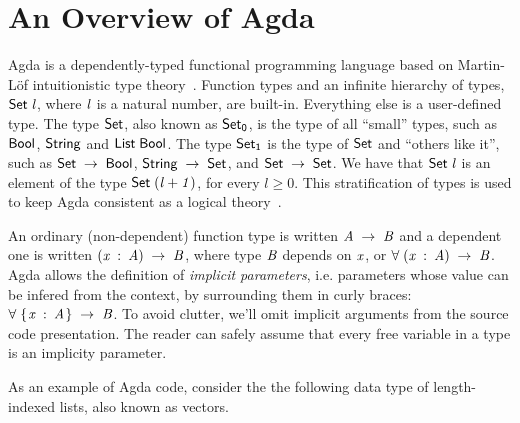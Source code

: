 \documentclass[fleqn,10pt]{SelfArx} %
\renewcommand{\geq}{\geqslant}
\theoremstyle{definition}
\newcommand{\D}[1]{\blue{\mathsf{#1}}}
\newcommand{\V}[1]{\purple{\mathit{#1}}}
\begin{document}
\section{An Overview of Agda}\label{sec:agda}


Agda is a dependently-typed functional programming language based on
Martin-L\"of intuitionistic type theory~\cite{Lof98}.  Function types
and an infinite hierarchy of types, \ensuremath{\D{Set}\;\V{l}}, where \ensuremath{\V{l}} is a
natural number, are built-in. Everything else is a user-defined
type. The type \ensuremath{\D{Set}}, also known as \ensuremath{\D{Set}_{\D{0}}}, is the type of all
``small'' types, such as \ensuremath{\D{Bool}}, \ensuremath{\D{String}} and \ensuremath{\D{List}\;\D{Bool}}.  The type
\ensuremath{\D{Set}_{\D{1}}} is the type of \ensuremath{\D{Set}} and ``others like it'', such as \ensuremath{\D{Set}\;\to \;\D{Bool}}, \ensuremath{\D{String}\;\to \;\D{Set}}, and \ensuremath{\D{Set}\;\to \;\D{Set}}. We have that \ensuremath{\D{Set}\;\V{l}} is an
element of the type \ensuremath{\D{Set}\;(\V{l+1})}, for every $l \geq 0$. This
stratification of types is used to keep Agda consistent as a logical
theory~\cite{Sorensen2006}.

An ordinary (non-dependent) function type is written \ensuremath{\V{A}\;\to \;\V{B}} and a
dependent one is written \ensuremath{(\V{x}\;\mathbin{:}\;\V{A})\;\to \;\V{B}}, where type \ensuremath{\V{B}} depends on
\ensuremath{\V{x}}, or \ensuremath{\D{\forall}\;(\V{x}\;\mathbin{:}\;\V{A})\;\to \;\V{B}}. Agda allows the definition of \emph{implicit
parameters}, i.e.  parameters whose value can be infered from the
context, by surrounding them in curly braces: \ensuremath{\D{\forall}\;\{\mskip1.5mu \V{x}\;\mathbin{:}\;\V{A}\mskip1.5mu\}\;\to \;\V{B}}. To
avoid clutter, we'll omit implicit arguments from the source code
presentation. The reader can safely assume that every free variable in
a type is an implicity parameter.

As an example of Agda code, consider the the following data type of
length-indexed lists, also known as vectors.
\end{document}

